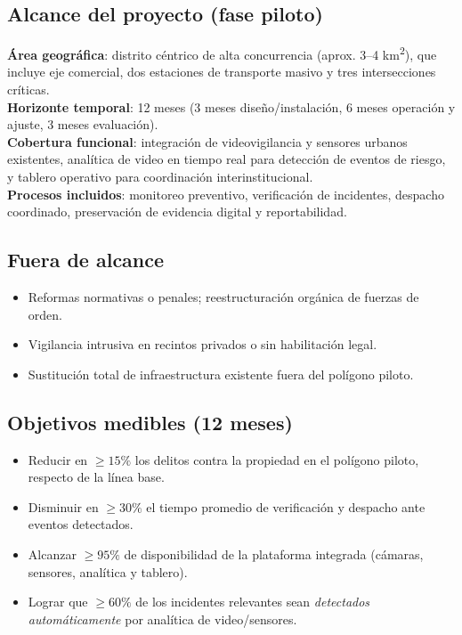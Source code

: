 \documentclass[12pt,a4paper]{article}
\begin{document}
\subsection*{Alcance del proyecto (fase piloto)}
\textbf{Área geográfica}: distrito céntrico de alta concurrencia (aprox. 3--4 km\textsuperscript{2}), que incluye eje comercial, dos estaciones de transporte masivo y tres intersecciones críticas.
\\
\textbf{Horizonte temporal}: 12 meses (3 meses diseño/instalación, 6 meses operación y ajuste, 3 meses evaluación).
\\
\textbf{Cobertura funcional}: integración de videovigilancia y sensores urbanos existentes, analítica de video en tiempo real para detección de eventos de riesgo, y tablero operativo para coordinación interinstitucional.
\\
\textbf{Procesos incluidos}: monitoreo preventivo, verificación de incidentes, despacho coordinado, preservación de evidencia digital y reportabilidad.

\subsection*{Fuera de alcance}
\begin{itemize}
    \item Reformas normativas o penales; reestructuración orgánica de fuerzas de orden.
    \item Vigilancia intrusiva en recintos privados o sin habilitación legal.
    \item Sustitución total de infraestructura existente fuera del polígono piloto.
\end{itemize}

\subsection*{Objetivos medibles (12 meses)}
\begin{itemize}
    \item Reducir en \(\geq 15\%\) los delitos contra la propiedad en el polígono piloto, respecto de la línea base.
    \item Disminuir en \(\geq 30\%\) el tiempo promedio de verificación y despacho ante eventos detectados.
    \item Alcanzar \(\geq 95\%\) de disponibilidad de la plataforma integrada (cámaras, sensores, analítica y tablero).
    \item Lograr que \(\geq 60\%\) de los incidentes relevantes sean \textit{detectados automáticamente} por analítica de video/sensores.
\end{itemize}
\end{document}
